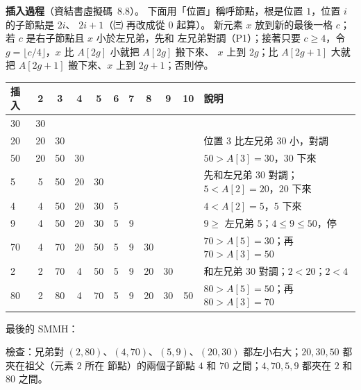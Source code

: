 \begin{pastsoln}
\textbf{插入過程}（資結書虛擬碼~8.8）。 下面用「位置」稱呼節點，根是位置 $1$，位置 $i$ 的子節點是 $2i$、
$2i + 1$（㈢ 再改成從 $0$ 起算）。 新元素 $x$ 放到新的最後一格 $c$；若 $c$ 是右子節點且 $x$ 小於左兄弟，先和
左兄弟對調（P1）；接著只要 $c \ge 4$，令 $g = \lfloor c/4 \rfloor$，$x$ 比 $A[2g]$ 小就把 $A[2g]$ 搬下來、
$x$ 上到 $2g$；比 $A[2g + 1]$ 大就把 $A[2g + 1]$ 搬下來、$x$ 上到 $2g + 1$；否則停。
\begin{center}
\small
\begin{tabular}{l*{9}{c}l}
\toprule
插入 & 2 & 3 & 4 & 5 & 6 & 7 & 8 & 9 & 10 & 說明 \\
\midrule
30 & 30 &&&&&&&&& \\
20 & 20 & 30 &&&&&&&& 位置 $3$ 比左兄弟 $30$ 小，對調 \\
50 & 20 & 50 & 30 &&&&&&& $50 > A[3] = 30$，$30$ 下來 \\
5 & 5 & 50 & 20 & 30 &&&&&& 先和左兄弟 $30$ 對調；$5 < A[2] = 20$，$20$ 下來 \\
4 & 4 & 50 & 20 & 30 & 5 &&&&& $4 < A[2] = 5$，$5$ 下來 \\
9 & 4 & 50 & 20 & 30 & 5 & 9 &&&& $9 \ge$ 左兄弟 $5$；$4 \le 9 \le 50$，停 \\
70 & 4 & 70 & 20 & 50 & 5 & 9 & 30 &&& $70 > A[5] = 30$；再 $70 > A[3] = 50$ \\
2 & 2 & 70 & 4 & 50 & 5 & 9 & 20 & 30 && 和左兄弟 $30$ 對調；$2 < 20$；$2 < 4$ \\
80 & 2 & 80 & 4 & 70 & 5 & 9 & 20 & 30 & 50 & $80 > A[5] = 50$；再 $80 > A[3] = 70$ \\
\bottomrule
\end{tabular}
\end{center}
最後的 SMMH：
\begin{center}
\end{center}
檢查：兄弟對 $(2, 80)$、$(4, 70)$、$(5, 9)$、$(20, 30)$ 都左小右大；$20, 30, 50$ 都夾在祖父（元素 $2$ 所在
節點）的兩個子節點 $4$ 和 $70$ 之間；$4, 70, 5, 9$ 都夾在 $2$ 和 $80$ 之間。


\end{pastsoln}
